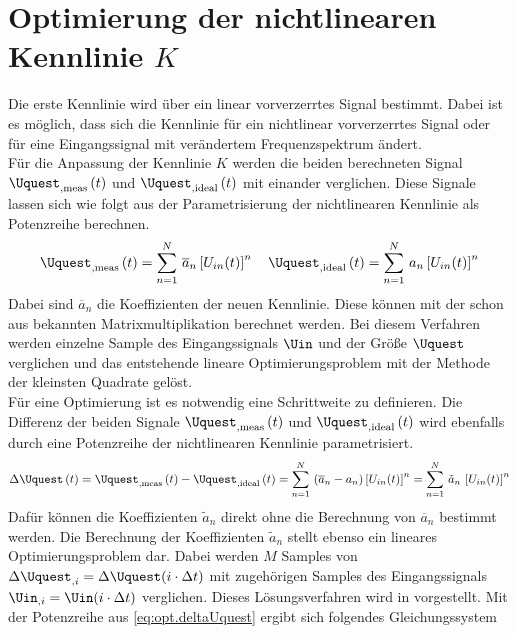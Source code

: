 \documentclass[../Report.tex]{subfiles}
\begin{document}
\section{Optimierung der nichtlinearen Kennlinie $K$}
\label{sec:opt.K}
Die erste Kennlinie wird über ein linear vorverzerrtes Signal bestimmt. Dabei ist es möglich, dass sich die Kennlinie für ein nichtlinear vorverzerrtes Signal oder für eine Eingangssignal mit verändertem Frequenzspektrum ändert. \\
Für die Anpassung der Kennlinie $K$ werden die beiden berechneten Signal $\Uquest_{, \mathrm{meas}} \oft$ und $\Uquest_{, \mathrm{ideal}} \oft$ mit einander verglichen. Diese Signale lassen sich wie folgt aus der Parametrisierung der nichtlinearen Kennlinie als Potenzreihe berechnen.
\begin{align}
	\Uquest_{, \mathrm{meas}} \oft = \sum_{n=1}^N \, \overline{a}_n \left[ U_{in}(t) \right]^n
	\quad
	\Uquest_{, \mathrm{ideal}} \oft = \sum_{n=1}^N \, a_n \left[ U_{in}(t) \right]^n
\end{align}
Dabei sind $\overline{a}_n$ die Koeffizienten der neuen Kennlinie. Diese können mit der schon aus \cite{harzheim} bekannten Matrixmultiplikation berechnet werden. Bei diesem Verfahren werden einzelne Sample des Eingangssignals $\Uin$ und der Größe $\Uquest$ verglichen und das entstehende lineare Optimierungsproblem mit der Methode der kleinsten Quadrate gelöst. \\
Für eine Optimierung ist es notwendig eine Schrittweite zu definieren. Die Differenz der beiden Signale $\Uquest_{, \mathrm{meas}} \oft$ und $\Uquest_{, \mathrm{ideal}} \oft$ wird ebenfalls durch eine Potenzreihe der nichtlinearen Kennlinie parametrisiert.
\begin{align}
\label{eq:opt.deltaUquest}
	\Delta \Uquest \oft = \Uquest_{, \mathrm{meas}} \oft - \Uquest_{, \mathrm{ideal}} \oft
	=
	\sum_{n=1}^N \, \left( \overline{a}_n -  a_n\right) \left[ U_{in}(t) \right]^n
	=
	\sum_{n=1}^N \, \tilde{a}_n \, \left[ U_{in}(t) \right]^n	
\end{align}
Dafür können die Koeffizienten $\tilde{a}_n$ direkt ohne die Berechnung von $\overline{a}_n$ bestimmt werden. Die Berechnung der Koeffizienten $\tilde{a}_n$ stellt ebenso ein lineares Optimierungsproblem dar. Dabei werden $M$ Samples von ${\Delta \Uquest_{,i} = \Delta \Uquest (i \cdot \Delta t)}$ mit zugehörigen Samples des Eingangssignals ${\Uin_{,i} = \Uin (i \cdot \Delta t)}$ verglichen. Dieses Lösungsverfahren wird in \cite{harzheim} vorgestellt. Mit der Potenzreihe aus \eqref{eq:opt.deltaUquest} ergibt sich folgendes Gleichungssystem
\end{document}
